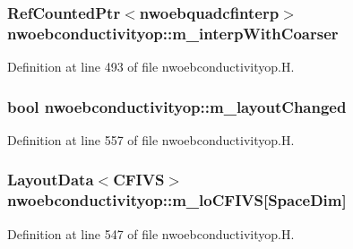 \subsubsection[{\texorpdfstring{m\+\_\+interp\+With\+Coarser}{m_interpWithCoarser}}]{\setlength{\rightskip}{0pt plus 5cm}Ref\+Counted\+Ptr$<${\bf nwoebquadcfinterp}$>$ nwoebconductivityop\+::m\+\_\+interp\+With\+Coarser\hspace{0.3cm}{\ttfamily [protected]}}\hypertarget{classnwoebconductivityop_a383804b8bbc133d6673d977f88d6bdc0}{}\label{classnwoebconductivityop_a383804b8bbc133d6673d977f88d6bdc0}


Definition at line 493 of file nwoebconductivityop.\+H.

\subsubsection[{\texorpdfstring{m\+\_\+layout\+Changed}{m_layoutChanged}}]{\setlength{\rightskip}{0pt plus 5cm}bool nwoebconductivityop\+::m\+\_\+layout\+Changed\hspace{0.3cm}{\ttfamily [protected]}}\hypertarget{classnwoebconductivityop_a412d9ce04c02be6115ded42b36c9aa08}{}\label{classnwoebconductivityop_a412d9ce04c02be6115ded42b36c9aa08}


Definition at line 557 of file nwoebconductivityop.\+H.

\subsubsection[{\texorpdfstring{m\+\_\+lo\+C\+F\+I\+VS}{m_loCFIVS}}]{\setlength{\rightskip}{0pt plus 5cm}Layout\+Data$<$C\+F\+I\+VS$>$ nwoebconductivityop\+::m\+\_\+lo\+C\+F\+I\+VS\mbox{[}Space\+Dim\mbox{]}\hspace{0.3cm}{\ttfamily [protected]}}\hypertarget{classnwoebconductivityop_a9d34665cc2800ef1dabdc30e395d0d28}{}\label{classnwoebconductivityop_a9d34665cc2800ef1dabdc30e395d0d28}


Definition at line 547 of file nwoebconductivityop.\+H.

